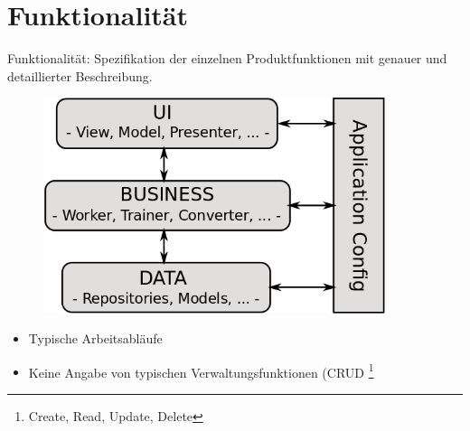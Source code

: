 \chapter{Funktionalität}
Funktionalität: Spezifikation der einzelnen Produktfunktionen mit genauer und
detaillierter Beschreibung.
\begin{figure}
\begin{center}
\includegraphics[width=10cm]{Abbildungen/SchichtenModell.png}
\end{center}
\end{figure}

\begin{itemize}
  \item Typische Arbeitsabläufe
  \item Keine Angabe von typischen Verwaltungsfunktionen (CRUD \footnote{Create,
Read, Update, Delete}
\end{itemize}
